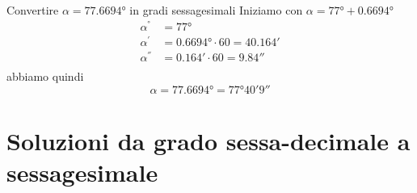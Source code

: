 \begin{exercise}
	Convertire $\alpha=\ang{77.6694}$ in gradi sessagesimali
	\tcblower
	Iniziamo con 
	$\alpha=\ang{77}+\ang{0.6694}$
	\begin{align*}
	\alpha^{\si{\degree}}&=\ang{77}\\ 
	\alpha^{\si{\arcminute}}&=\ang{0.6694}\cdot 60=\ang{;40.164;}\\
	\alpha^{\si{\arcsecond}}&=\ang{;0.164;}\cdot 60=\ang{;;9.84}\\
	\end{align*}
	abbiamo quindi
	\[\alpha=\ang{77.6694}=\ang{77;40;9}\]
\end{exercise}
\tcbstoprecording
\newpage
\section{Soluzioni da grado sessa-decimale a sessagesimale}
\tcbinputrecords